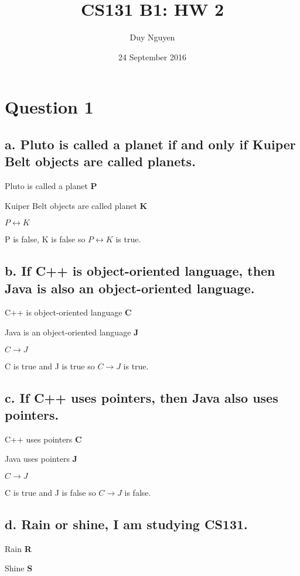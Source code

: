 \documentclass{article}
\title{CS131 B1: HW 2}
\author{Duy Nguyen}
\date{24 September 2016}
\begin{document}
\maketitle

\section*{Question 1}

\subsection*{a. Pluto is called a planet if and only if Kuiper Belt objects are called planets.}

Pluto is called a planet \textbf{P}

Kuiper Belt objects are called planet \textbf{K}

$P \leftrightarrow K$

P is false, K is false so $P \leftrightarrow K$ is true.

\subsection*{b. If C++ is object-oriented language, then Java is also an object-oriented language.}

C++ is object-oriented language \textbf{C}

Java is an object-oriented language \textbf{J}

$C \rightarrow J$

C is true and J is true so $C \rightarrow J$ is true.

\subsection*{c. If C++ uses pointers, then Java also uses pointers.}

C++ uses pointers \textbf{C}

Java uses pointers \textbf{J}

$C \rightarrow J$

C is true and J is false so $C \rightarrow J$ is false.

\subsection*{d. Rain or shine, I am studying CS131.}

Rain \textbf{R} 

Shine \textbf{S} 
\end{document}
